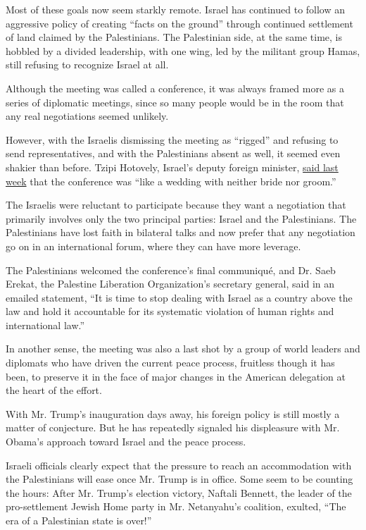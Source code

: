 Most of these goals now seem starkly remote. Israel has continued to
follow an aggressive policy of creating ``facts on the ground'' through
continued settlement of land claimed by the Palestinians. The
Palestinian side, at the same time, is hobbled by a divided leadership,
with one wing, led by the militant group Hamas, still refusing to
recognize Israel at all.

Although the meeting was called a conference, it was always framed more
as a series of diplomatic meetings, since so many people would be in the
room that any real negotiations seemed unlikely.

However, with the Israelis dismissing the meeting as ``rigged'' and
refusing to send representatives, and with the Palestinians absent as
well, it seemed even shakier than before. Tzipi Hotovely, Israel's
deputy foreign minister,
\href{https://www.nytimes3xbfgragh.onion/2017/01/15/world/middleeast/missing-at-israel-palestinian-peace-conference-israelis-or-palestinians.html}{said
last week} that the conference was ``like a wedding with neither bride
nor groom.''

The Israelis were reluctant to participate because they want a
negotiation that primarily involves only the two principal parties:
Israel and the Palestinians. The Palestinians have lost faith in
bilateral talks and now prefer that any negotiation go on in an
international forum, where they can have more leverage.

The Palestinians welcomed the conference's final communiqué, and Dr.
Saeb Erekat, the Palestine Liberation Organization's secretary general,
said in an emailed statement, ``It is time to stop dealing with Israel
as a country above the law and hold it accountable for its systematic
violation of human rights and international law.''

In another sense, the meeting was also a last shot by a group of world
leaders and diplomats who have driven the current peace process,
fruitless though it has been, to preserve it in the face of major
changes in the American delegation at the heart of the effort.

With Mr. Trump's inauguration days away, his foreign policy is still
mostly a matter of conjecture. But he has repeatedly signaled his
displeasure with Mr. Obama's approach toward Israel and the peace
process.

Israeli officials clearly expect that the pressure to reach an
accommodation with the Palestinians will ease once Mr. Trump is in
office. Some seem to be counting the hours: After Mr. Trump's election
victory, Naftali Bennett, the leader of the pro-settlement Jewish Home
party in Mr. Netanyahu's coalition, exulted, ``The era of a Palestinian
state is over!''

